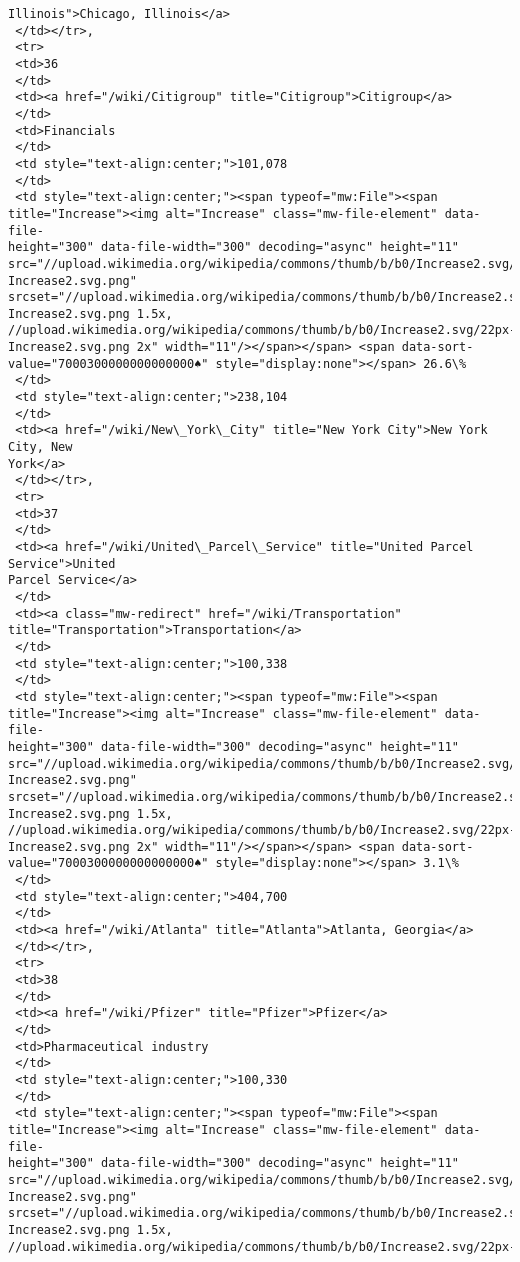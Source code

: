 \documentclass[11pt]{article}
\begin{document}
\begin{tcolorbox}[breakable, size=fbox, boxrule=.5pt, pad at break*=1mm, opacityfill=0]
\begin{Verbatim}[commandchars=\\\{\}]
Illinois">Chicago, Illinois</a>
 </td></tr>,
 <tr>
 <td>36
 </td>
 <td><a href="/wiki/Citigroup" title="Citigroup">Citigroup</a>
 </td>
 <td>Financials
 </td>
 <td style="text-align:center;">101,078
 </td>
 <td style="text-align:center;"><span typeof="mw:File"><span
title="Increase"><img alt="Increase" class="mw-file-element" data-file-
height="300" data-file-width="300" decoding="async" height="11"
src="//upload.wikimedia.org/wikipedia/commons/thumb/b/b0/Increase2.svg/11px-
Increase2.svg.png"
srcset="//upload.wikimedia.org/wikipedia/commons/thumb/b/b0/Increase2.svg/17px-
Increase2.svg.png 1.5x,
//upload.wikimedia.org/wikipedia/commons/thumb/b/b0/Increase2.svg/22px-
Increase2.svg.png 2x" width="11"/></span></span> <span data-sort-
value="7000300000000000000♠" style="display:none"></span> 26.6\%
 </td>
 <td style="text-align:center;">238,104
 </td>
 <td><a href="/wiki/New\_York\_City" title="New York City">New York City, New
York</a>
 </td></tr>,
 <tr>
 <td>37
 </td>
 <td><a href="/wiki/United\_Parcel\_Service" title="United Parcel Service">United
Parcel Service</a>
 </td>
 <td><a class="mw-redirect" href="/wiki/Transportation"
title="Transportation">Transportation</a>
 </td>
 <td style="text-align:center;">100,338
 </td>
 <td style="text-align:center;"><span typeof="mw:File"><span
title="Increase"><img alt="Increase" class="mw-file-element" data-file-
height="300" data-file-width="300" decoding="async" height="11"
src="//upload.wikimedia.org/wikipedia/commons/thumb/b/b0/Increase2.svg/11px-
Increase2.svg.png"
srcset="//upload.wikimedia.org/wikipedia/commons/thumb/b/b0/Increase2.svg/17px-
Increase2.svg.png 1.5x,
//upload.wikimedia.org/wikipedia/commons/thumb/b/b0/Increase2.svg/22px-
Increase2.svg.png 2x" width="11"/></span></span> <span data-sort-
value="7000300000000000000♠" style="display:none"></span> 3.1\%
 </td>
 <td style="text-align:center;">404,700
 </td>
 <td><a href="/wiki/Atlanta" title="Atlanta">Atlanta, Georgia</a>
 </td></tr>,
 <tr>
 <td>38
 </td>
 <td><a href="/wiki/Pfizer" title="Pfizer">Pfizer</a>
 </td>
 <td>Pharmaceutical industry
 </td>
 <td style="text-align:center;">100,330
 </td>
 <td style="text-align:center;"><span typeof="mw:File"><span
title="Increase"><img alt="Increase" class="mw-file-element" data-file-
height="300" data-file-width="300" decoding="async" height="11"
src="//upload.wikimedia.org/wikipedia/commons/thumb/b/b0/Increase2.svg/11px-
Increase2.svg.png"
srcset="//upload.wikimedia.org/wikipedia/commons/thumb/b/b0/Increase2.svg/17px-
Increase2.svg.png 1.5x,
//upload.wikimedia.org/wikipedia/commons/thumb/b/b0/Increase2.svg/22px-

\end{Verbatim}
\end{tcolorbox}
\end{document}
